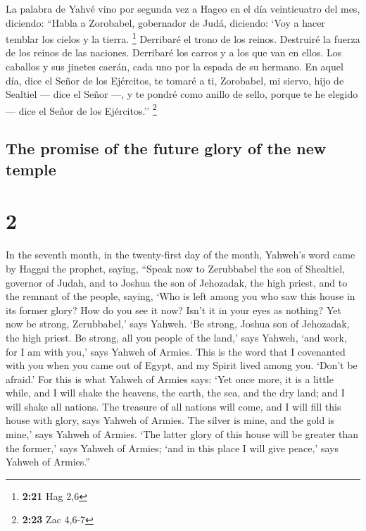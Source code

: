 \begin{paracol}{2}
 La palabra de Yahvé vino por segunda vez a Hageo en el
día veinticuatro del mes, diciendo:  ``Habla a Zorobabel,
gobernador de Judá, diciendo: `Voy a hacer temblar los cielos y la
tierra. \footnote{\textbf{2:21} Hag 2,6}  Derribaré el
trono de los reinos. Destruiré la fuerza de los reinos de las naciones.
Derribaré los carros y a los que van en ellos. Los caballos y sus
jinetes caerán, cada uno por la espada de su hermano.  En
aquel día, dice el Señor de los Ejércitos, te tomaré a ti, Zorobabel, mi
siervo, hijo de Sealtiel --- dice el Señor ---, y te pondré como anillo
de sello, porque te he elegido --- dice el Señor de los Ejércitos.''
\footnote{\textbf{2:23} Zac 4,6-7} \switchcolumn
\begin{otherlanguage}{english}

\hypertarget{the-promise-of-the-future-glory-of-the-new-temple}{%
\subsection{The promise of the future glory of the new
temple}\label{the-promise-of-the-future-glory-of-the-new-temple}}

\hypertarget{section-3}{%
\section{2}\label{section-3}}

 In the seventh month, in the twenty-first day of the
month, Yahweh's word came by Haggai the prophet, saying, 
``Speak now to Zerubbabel the son of Shealtiel, governor of Judah, and
to Joshua the son of Jehozadak, the high priest, and to the remnant of
the people, saying,  `Who is left among you who saw this
house in its former glory? How do you see it now? Isn't it in your eyes
as nothing?  Yet now be strong, Zerubbabel,' says Yahweh.
`Be strong, Joshua son of Jehozadak, the high priest. Be strong, all you
people of the land,' says Yahweh, `and work, for I am with you,' says
Yahweh of Armies.  This is the word that I covenanted with
you when you came out of Egypt, and my Spirit lived among you. `Don't be
afraid.'  For this is what Yahweh of Armies says: `Yet
once more, it is a little while, and I will shake the heavens, the
earth, the sea, and the dry land;  and I will shake all
nations. The treasure of all nations will come, and I will fill this
house with glory, says Yahweh of Armies.  The silver is
mine, and the gold is mine,' says Yahweh of Armies.  `The
latter glory of this house will be greater than the former,' says Yahweh
of Armies; `and in this place I will give peace,' says Yahweh of
Armies.''


\end{otherlanguage}
\end{paracol}
